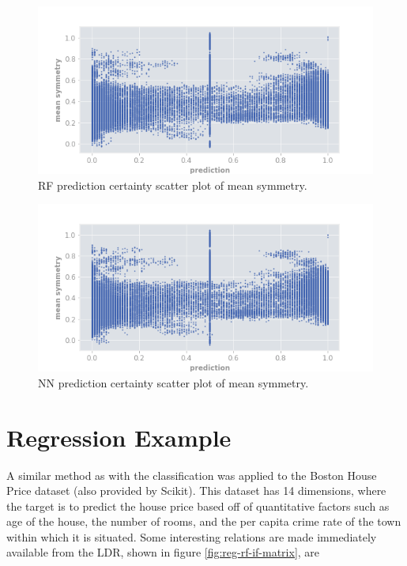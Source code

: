\documentclass[a4paper, oneside, twocolumn]{article}
\begin{document}
\begin{figure}
\centering
\includegraphics[width=0.7\columnwidth]{img/rf_if_mean_symmetry.png}
\caption{RF prediction certainty scatter plot of mean symmetry.}
\label{fig:rf-if-mean-symmetry-scatter}
\end{figure}

\begin{figure}
\centering
\includegraphics[width=0.7\columnwidth]{img/nn_if_mean_symmetry.png}
\caption{NN prediction certainty scatter plot of mean symmetry.}
\label{fig:nn-if-mean-symmetry-scatter}
\end{figure}

\section{Regression Example}

A similar method as with the classification was applied to the Boston House Price dataset \cite{bostonhouse} (also provided by Scikit). This dataset has 14 dimensions, where the target is to predict the house price based off of quantitative factors such as age of the house, the number of rooms, and the per capita crime rate of the town within which it is situated. Some interesting relations are made immediately available from the LDR, shown in figure \ref{fig:reg-rf-if-matrix}, are
\end{document}
